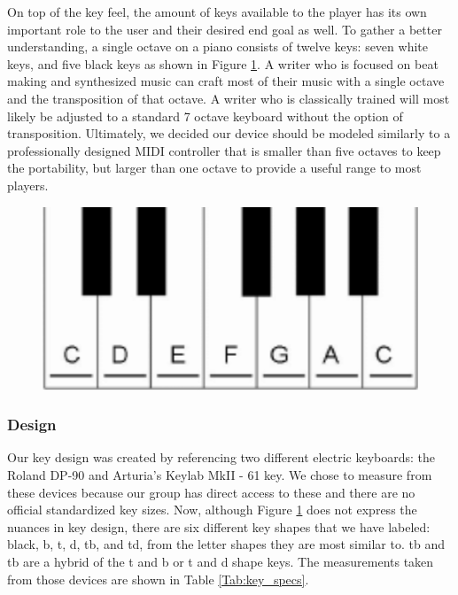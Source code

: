 On top of the key feel, the amount of keys available to the player has its own important role to the user and their desired end goal as well. To gather a better understanding, a single octave on a piano consists of twelve keys: seven white keys, and five black keys as shown in Figure \ref{fig:octave}. A writer who is focused on beat making and synthesized music can craft most of their music with a single octave and the transposition of that octave. A writer who is classically trained will most likely be adjusted to a standard 7 octave keyboard without the option of transposition. Ultimately, we decided our device should be modeled similarly to a professionally designed MIDI controller that is smaller than five octaves to keep the portability, but larger than one octave to provide a useful range to most players.

\begin{figure}[h!]
  \centering
  \includegraphics[width=0.5\linewidth]{image/Octave.png}
  \caption{}
  \label{fig:octave}
\end{figure}

\subsubsection{Design}
Our key design was created by referencing two different electric keyboards: the Roland DP-90 and Arturia’s Keylab MkII - 61 key. We chose to measure from these devices because our group has direct access to these and there are no official standardized key sizes. Now, although Figure \ref{fig:octave} does not express the nuances in key design, there are six different key shapes that we have labeled: black, b, t, d, tb, and td, from the letter shapes they are most similar to. tb and tb are a hybrid of the t and b or t and d shape keys. The measurements taken from those devices are shown in Table \ref{Tab:key_specs}.

